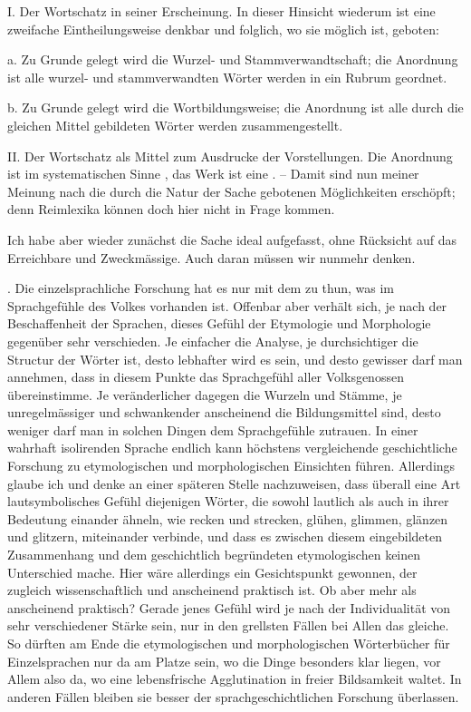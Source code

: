 \label{fp.131}

I. Der Wortschatz in seiner Erscheinung. In dieser Hinsicht wiederum ist eine zweifache Eintheilungsweise denkbar und folglich, wo sie möglich ist, geboten:

a. Zu Grunde gelegt wird die Wurzel- und Stammverwandtschaft; die Anordnung ist  alle wurzel- und stammverwandten Wörter werden in ein Rubrum geordnet.

b. Zu Grunde gelegt wird die Wortbildungsweise; die Anordnung ist  alle durch die gleichen Mittel gebildeten Wörter werden zusammengestellt.

II. Der Wortschatz als Mittel zum Ausdrucke der Vorstellungen. Die Anordnung ist im systematischen Sinne , das Werk ist eine . – Damit sind nun meiner Meinung nach die durch die Natur der Sache gebotenen Möglichkeiten erschöpft; denn Reimlexika können doch hier nicht in Frage kommen.

Ich habe aber wieder zunächst die Sache ideal aufgefasst, ohne Rücksicht auf das Erreichbare und Zweckmässige. Auch daran müssen wir nunmehr denken.

. Die einzelsprachliche Forschung hat es nur mit dem zu thun, \label{sp.124} was im Sprachgefühle des Volkes vorhanden ist. Offenbar aber verhält sich, je nach der Beschaffenheit der Sprachen, dieses Gefühl der Etymologie und Morphologie gegenüber sehr verschieden. Je einfacher die Analyse, je durchsichtiger die Structur der Wörter ist, desto lebhafter wird es sein, und desto gewisser darf man annehmen, dass in diesem Punkte das Sprachgefühl aller Volksgenossen übereinstimme. Je veränderlicher dagegen die Wurzeln und Stämme, je unregelmässiger und schwankender anscheinend die Bildungsmittel sind, desto weniger darf man in solchen Dingen dem Sprachgefühle zutrauen. In einer wahrhaft isolirenden Sprache endlich kann höchstens vergleichende geschichtliche Forschung zu etymologischen und morphologischen Einsichten führen. Allerdings glaube ich und denke an einer späteren Stelle nachzuweisen, dass überall eine Art lautsymbolisches Gefühl diejenigen Wörter, die sowohl lautlich als auch in ihrer Bedeutung einander ähneln, wie recken und strecken, glühen, glimmen, glänzen und glitzern, miteinander verbinde, und dass es zwischen diesem eingebildeten Zusammenhang und dem geschichtlich begründeten etymologischen keinen Unterschied mache. Hier wäre allerdings ein Gesichtspunkt gewonnen, der zugleich wissenschaftlich und anscheinend praktisch ist. Ob aber mehr als anscheinend \label{fp.132} praktisch? Gerade jenes Gefühl wird je nach der Individualität von sehr verschiedener Stärke sein, nur in den grellsten Fällen bei Allen das gleiche. So dürften am Ende die etymologischen und morphologischen Wörterbücher für Einzelsprachen nur da am Platze sein, wo die Dinge besonders klar liegen, vor Allem also da, wo eine lebensfrische Agglutination in freier Bildsamkeit waltet. In anderen Fällen bleiben sie besser der sprachgeschichtlichen Forschung überlassen.

